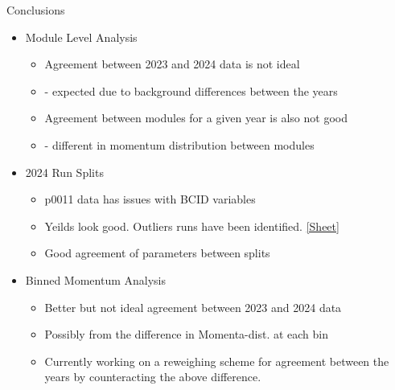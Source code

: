 \begin{frame}{Conclusions}
    \begin{itemize}
        \item Module Level Analysis
        \begin{itemize}
            \item Agreement between 2023 and 2024 data is not ideal 
            \item[] - expected due to background differences between the years
            \item Agreement between modules for a given year is also not good 
            \item[] - different in momentum distribution between modules
        \end{itemize}
        \item 2024 Run Splits
        \begin{itemize}
            \item p0011 data has issues with BCID variables
            \item Yeilds look good. Outliers runs have been identified. \href{https://docs.google.com/spreadsheets/d/1nnYFcmhVieSHI5XAVhPiW1K6CoGYGxv2YPchwL0sqH4/edit?usp=sharing}{[Sheet]}
            \item Good agreement of parameters between splits
        \end{itemize}
        \item Binned Momentum Analysis
        \begin{itemize}
            \item Better but not ideal agreement between 2023 and 2024 data
            \item Possibly from the difference in Momenta-dist. at each bin
            \item Currently working on a reweighing scheme for agreement between the years by counteracting the above difference.
        \end{itemize}
    \end{itemize}
    

\end{frame}